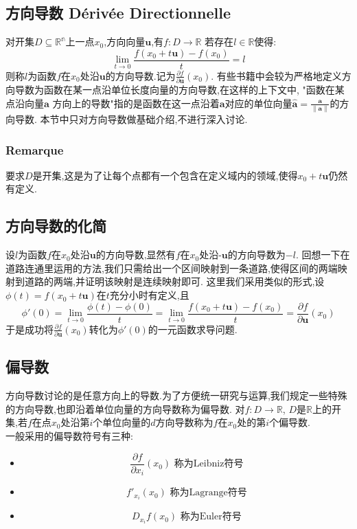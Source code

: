 \documentclass[12pt, a4paper, oneside]{ctexbook}
\begin{document}
  \subsection{方向导数 Dérivée Directionnelle}
  对开集$D\subseteq \mathbb{R^n}$上一点$x_0$,方向向量$\textbf{u}$,有$f:D\rightarrow \mathbb{R}$
  若存在$l\in\mathbb{R}$使得:
  $$
  \lim_{t \to 0} \frac{f(x_0+t\textbf{u})-f(x_0)}{t} =l
  $$
  则称$l$为函数$f$在$x_0$处沿$\textbf{u}$的方向导数.记为$\frac{\partial f}{\partial \textbf{u}}(x_0)$.
  有些书籍中会较为严格地定义方向导数为函数在某一点沿单位长度向量的方向导数,在这样的上下文中,
  "函数在某点沿向量$\mathbf{a}$ 方向上的导数"指的是函数在这一点沿着$\mathbf{a}$对应的单位向量$\hat{\mathbf{a}}=\frac{\mathbf{a}}{\left\lVert \mathbf{a}\right\rVert }$的方向导数.
  本节中只对方向导数做基础介绍,不进行深入讨论.
  \subsubsection{Remarque}
  要求$D$是开集,这是为了让每个点都有一个包含在定义域内的领域,使得$x_0+t\textbf{u}$仍然有定义.
  \subsection{方向导数的化简}
  设$l$为函数$f$在$x_0$处沿$\textbf{u}$的方向导数,显然有$f$在$x_0$处沿$\textbf{-u}$的方向导数为$-l$.
  回想一下在道路连通里运用的方法,我们只需给出一个区间映射到一条道路,使得区间的两端映射到道路的两端,并证明该映射是连续映射即可.
  这里我们采用类似的形式,设$\phi(t)=f(x_0+t\textbf{u})$在$t$充分小时有定义,且
  $$
  \phi'(0)=\lim_{t \to 0} \frac{\phi(t)-\phi(0)}{t} =\lim_{t \to 0}\frac{f(x_0+t\textbf{u})-f(x_0)}{t}=\frac{\partial f}{\partial \textbf{u}}(x_0)
  $$
  于是成功将$\frac{\partial f}{\partial \textbf{u}}(x_0)$转化为$\phi'(0)$的一元函数求导问题.
  \subsection{偏导数}
  方向导数讨论的是任意方向上的导数.为了方便统一研究与运算,我们规定一些特殊的方向导数,也即沿着单位向量的方向导数称为偏导数.
  对$f:D\rightarrow \mathbb{R}$, $D$是$\mathbb{R}$上的开集,若$f$在点$x_0$处沿第$i$个单位向量的$d$方向导数称为$f$在$x_0$处的第$i$个偏导数.\\
  
  
  一般采用的偏导数符号有三种:
  \begin{itemize}
    \item $$\frac{\partial f}{\partial x_i}(x_0)\text{ 称为Leibniz符号}$$ 
    \item $$f'_{x_i}(x_0) \text{ 称为Lagrange符号}$$
    \item $$D_{x_i}f(x_0) \text{ 称为Euler符号}$$
  \end{itemize}
\end{document}

